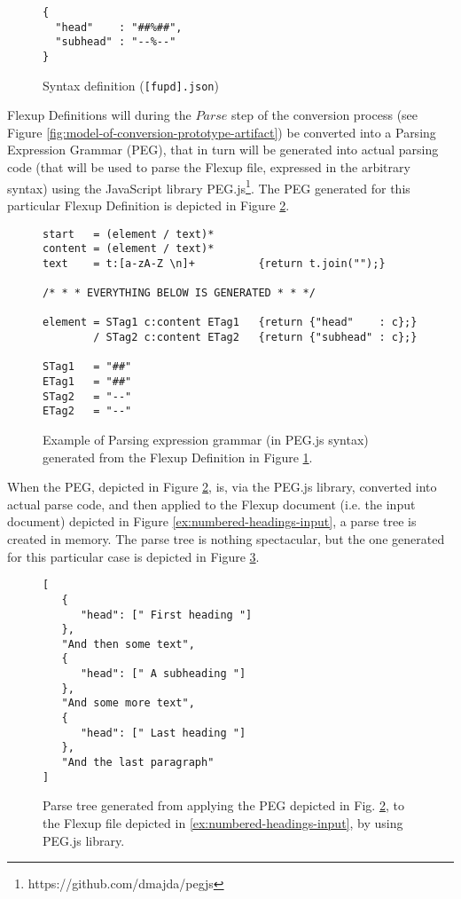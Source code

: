 \documentclass{scrreprt}
\begin{document}
\begin{figure}[h]
\begin{lstlisting}
{
  "head"    : "##%##",
  "subhead" : "--%--"
}
\end{lstlisting}
\caption{Syntax definition (\texttt{[fupd].json})}
\label{ex:numbered-headings-fupd}
\end{figure}

Flexup Definitions will during the $Parse$ step of the conversion process (see Figure \ref{fig:model-of-conversion-prototype-artifact}) be converted into a Parsing Expression Grammar (PEG), that in turn will be generated into actual parsing code (that will be used to parse the Flexup file, expressed in the arbitrary syntax) using the JavaScript library PEG.js\footnote{https://github.com/dmajda/pegjs}. The PEG generated for this particular Flexup Definition is depicted in Figure \ref{ex:peg-grammar}.


\begin{figure}[h]
\centering
\begin{lstlisting}
start   = (element / text)*
content = (element / text)*
text    = t:[a-zA-Z \n]+          {return t.join("");}

/* * * EVERYTHING BELOW IS GENERATED * * */

element = STag1 c:content ETag1   {return {"head"    : c};}
        / STag2 c:content ETag2   {return {"subhead" : c};}

STag1   = "##"
ETag1   = "##"
STag2   = "--"
ETag2   = "--"
\end{lstlisting}
\caption{Example of Parsing expression grammar (in PEG.js syntax) generated from the Flexup Definition in Figure \ref{ex:numbered-headings-fupd}.}
\label{ex:peg-grammar}
\end{figure}

When the PEG, depicted in Figure \ref{ex:peg-grammar}, is, via the PEG.js library, converted into actual parse code, and then applied to the Flexup document (i.e. the input document) depicted in Figure \ref{ex:numbered-headings-input}, a parse tree is created in memory. The parse tree is nothing spectacular, but the one generated for this particular case is depicted in Figure \ref{ex:generated-parse-tree}.

\begin{figure}[h]
\begin{lstlisting}
[
   {
      "head": [" First heading "]
   },
   "And then some text",
   {
      "head": [" A subheading "]
   },
   "And some more text",
   {
      "head": [" Last heading "]
   },
   "And the last paragraph"
]
\end{lstlisting}
\caption{Parse tree generated from applying the PEG depicted in Fig. \ref{ex:peg-grammar}, to the Flexup file depicted in \ref{ex:numbered-headings-input}, by using PEG.js library.}
\label{ex:generated-parse-tree}
\end{figure}
\end{document}
